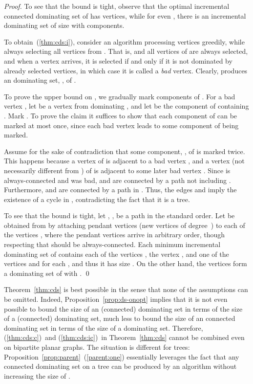 \begin{proof}
To see that the bound is tight, observe that the optimal incremental
connected dominating set 
of  has  vertices, while for even , there is an
incremental dominating set of size  with  components.

To obtain~(\ref{thm:cds:i}),
consider an algorithm  processing vertices greedily,
while always selecting all 
vertices from . That is,  and all vertices of  are always selected,
and when a vertex  arrives, it is selected
 if and only if it is not dominated by already selected vertices, in which case
it is called a \emph{bad} vertex.
Clearly, \ALG produces an \incr dominating set, , of . 

To prove the upper bound on , we gradually mark components of .
For a bad vertex , let  be
a vertex from  dominating , and let  be the component of 
containing .
Mark .
To prove the claim it suffices to show that each component of  can
be marked at most once, since each bad vertex leads to some component
of  being marked.

Assume for the sake of contradiction that some component, , of
 is marked twice.
This happens because a vertex  of  is adjacent to a bad vertex ,
and a vertex  (not necessarily different from ) of  is
adjacent to some later bad vertex . 
Since  is always-connected and  was bad, 
 and  are connected by a path not
including .
Furthermore,  and  are connected by a path in . Thus, the
edges  and 
 imply the existence of a cycle in ,
contradicting the fact that it is a tree.

To see that the bound is tight, let , ,
be a path in the standard order.  Let  be obtained from
 by attaching  pendant vertices (new vertices of degree~) to
each of the vertices , where the pendant
vertices arrive in arbitrary order, though respecting that
 should be always-connected.
Each minimum incremental dominating set of
 contains each of the vertices ,
the vertex , and one of the vertices  and  for
each , and thus it has size .  On the other hand, the
vertices  form a dominating set  of 
with .
\qed\end{proof}

Theorem~\ref{thm:cds} is best possible
in the sense that none of the assumptions can be omitted.
Indeed, Proposition~\ref{prop:ds-onopt} implies that it is not even
possible to bound
the size of an \incr (connected) dominating set in terms of the size
of a (connected) dominating set, much less
to bound the size of an \incr connected dominating set in terms of the
size of a dominating set. 
Therefore, (\ref{thm:cds:c})~and (\ref{thm:cds:ic})~in Theorem~\ref{thm:cds}
cannot be combined even on bipartite planar graphs.
The situation is different for trees:
Proposition~\ref{prop:parent}~(\ref{parent:one}) essentially leverages the fact
that any connected dominating set  on a tree can
be produced by an \incr algorithm without increasing the size of .


